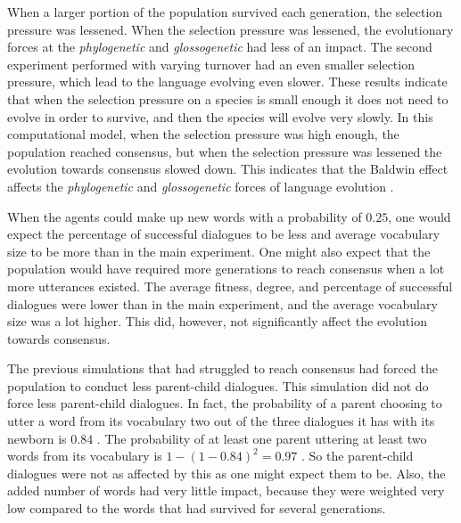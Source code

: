 When a larger portion of the population survived each generation, the selection pressure was lessened. When the selection pressure was lessened, the evolutionary forces at the \textit{phylogenetic} and \textit{glossogenetic}  had less of an impact. The second experiment performed with varying turnover had an even smaller selection pressure, which lead to the language evolving even slower. These results indicate that when the selection pressure on a species is small enough it does not need to evolve in order to survive, and then the species will evolve very slowly. In this computational model, when the selection pressure was high enough, the population reached consensus, but when the selection pressure was lessened the evolution towards consensus slowed down. This indicates that the Baldwin effect affects the \textit{phylogenetic} and \textit{glossogenetic} forces of language evolution . 


When the agents could make up new words with a probability of $0.25$, one would expect the percentage of successful dialogues to be less and average vocabulary size to be more than in the main experiment. One might also expect that the population would have required more generations to reach consensus when a lot more utterances existed. The average fitness, degree, and percentage of successful dialogues were lower than in the main experiment, and the average vocabulary size was a lot higher. This did, however, not significantly affect the evolution towards consensus. 

The previous simulations that had struggled to reach consensus had forced the population to conduct less parent-child dialogues. This simulation did not do force less parent-child dialogues. In fact, the probability of a parent choosing to utter a word from its vocabulary two out of the three dialogues it has with its newborn is $0.84$ . The probability of at least one parent uttering at least two words from its vocabulary is $ 1 - (1-0.84)^2 = 0.97$ . So the parent-child dialogues were not as affected by this as one might expect them to be. Also, the added number of words had very little impact, because they were weighted very low compared to the words that had survived for several generations. 

